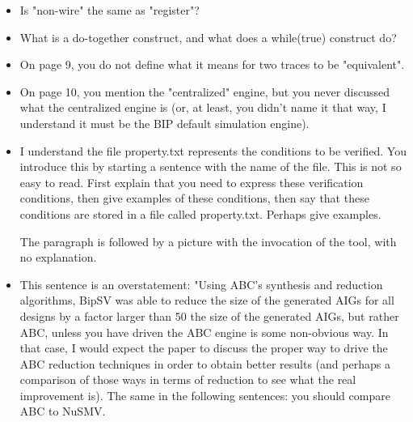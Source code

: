 \begin{itemize}
\begin{itemize}
\item Is "non-wire" the same as "register"?

\item What is a do-together construct, and what does a while(true) construct do?

\item On page 9, you do not define what it means for two traces to be "equivalent".

\item On page 10, you mention the "centralized" engine, but you never discussed
what the centralized engine is (or, at least, you didn't name it that way, I
understand it must be the BIP default simulation engine).

\item I understand the file property.txt represents the conditions to be verified.
You introduce this by starting a sentence with the name of the file. This is
not so easy to read. First explain that you need to express these
verification conditions, then give examples of these conditions, then say
that these conditions are stored in a file called property.txt. Perhaps
give examples.

The paragraph is followed by a picture with the invocation of the tool, with
no explanation.

\item This sentence is an overstatement: "Using ABC’s synthesis and reduction
algorithms, BipSV was able to reduce the size of the generated AIGs for all
designs by a factor larger than 50%
the size of the generated AIGs, but rather ABC, unless you have driven the
ABC engine is some non-obvious way. In that case, I would expect the paper
to discuss the proper way to drive the ABC reduction techniques in order to
obtain better results (and perhaps a comparison of those ways in terms of
reduction to see what the real improvement is). The same in the following
sentences: you should compare ABC to NuSMV.

\end{itemize}
\end{itemize}

















